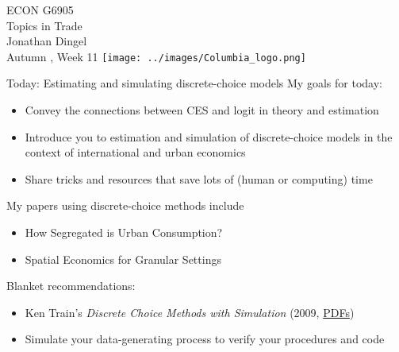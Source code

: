 \documentclass[11pt,notes=hide,aspectratio=169]{beamer}
\begin{document}
\begin{frame}[plain]
\begin{center}
\large
\textcolor{columbiadarkblue}{ECON G6905\\
Topics in Trade\\ 
Jonathan Dingel\\
Autumn \the\year, Week 11}
\vfill 
\texttt{[image: ../images/Columbia\_logo.png]}
\end{center}
\end{frame}
\begin{frame}{Today: Estimating and simulating discrete-choice models}
My goals for today:
\begin{itemize}
	\item Convey the connections between CES and logit in theory and estimation
	\item Introduce you to estimation and simulation of discrete-choice models in the context of international and urban economics
	\item Share tricks and resources that save lots of (human or computing) time
\end{itemize}
My papers using discrete-choice methods include
\begin{itemize}
	\item How Segregated is Urban Consumption?
	\item Spatial Economics for Granular Settings
\end{itemize}
Blanket recommendations:
\begin{itemize}
\item Ken Train's \textit{Discrete Choice Methods with Simulation} (2009, \href{https://eml.berkeley.edu/books/choice2.html}{PDFs})
\item Simulate your data-generating process to verify your procedures and code
\end{itemize}
\end{frame}
\end{document}
